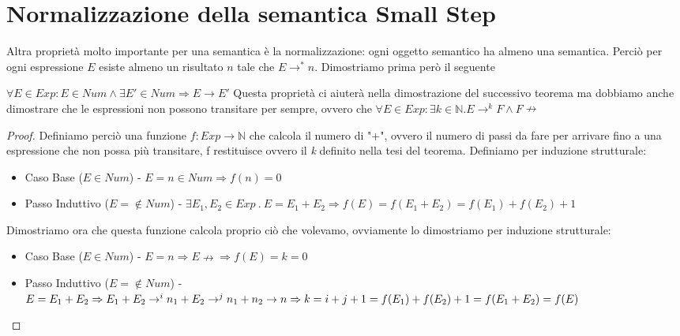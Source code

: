 \section{Normalizzazione della semantica Small Step} 
Altra proprietà molto importante per una semantica è la normalizzazione:
ogni oggetto semantico ha almeno una semantica. Perciò per ogni espressione $E$
esiste almeno un risultato $n$ tale che $E \rightarrow ^* n$.
Dimostriamo prima però il seguente

\begin{lemma}
  $\forall E \in Exp : E \in Num \land \exists E' \in Num \Rightarrow E \rightarrow E'$
  Questa proprietà ci aiuterà nella dimostrazione del successivo teorema ma dobbiamo anche dimostrare che le espressioni non possono transitare per sempre,
  ovvero che $\forall E \in Exp : \exists k \in \mathbb{N} . E \rightarrow ^k F \land F \nrightarrow$
\end{lemma}

\begin{proof}
  Definiamo perciò una funzione $f : Exp \rightarrow \mathbb{N}$ che calcola il numero di "+", ovvero il numero di passi da fare per arrivare fino a una
  espressione che non possa più transitare, f restituisce ovvero il \emph{k} definito nella tesi del teorema. Definiamo per induzione strutturale:
  \begin{itemize}
    \item Caso Base ($E \in Num$) - $E = n \in Num \Rightarrow f(n) = 0$
    \item Passo Induttivo ($E = \not \in Num$) - $\exists E_1, E_2 \in Exp\ .\ E = E_1 + E_2 \Rightarrow f(E) = f(E_1 + E_2) = f(E_1) + f(E_2) + 1$
  \end{itemize}
  Dimostriamo ora che questa funzione calcola proprio ciò che volevamo, ovviamente lo dimostriamo per induzione strutturale:
  \begin{itemize}
  \item Caso Base ($E \in Num$) - $E = n \Rightarrow E \nrightarrow \Rightarrow f(E) = k = 0$
  \item Passo Induttivo ($E = \not \in Num$) - $E = E_1 + E_2 \Rightarrow \\ E_1 + E_2 \rightarrow ^i n_1 + E_2 \rightarrow ^j n_1 + n_2 \rightarrow n \\
    \Rightarrow k = i + j + 1 = f(E_1) + f(E_2) + 1 = f(E_1 + E_2) = f(E)$
  \end{itemize}
\end{proof}

